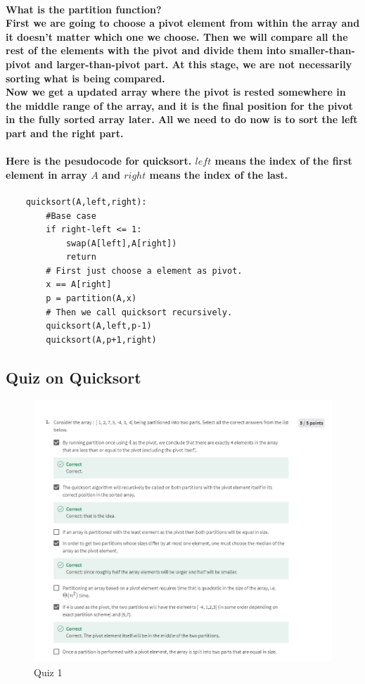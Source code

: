 \documentclass{article}
\begin{document}
 \paragraph{What is the partition function?\\
 First we are going to choose a pivot element from within the array and it doesn't matter which one we choose.
 Then we will compare all the rest of the elements with the pivot and divide them into smaller-than-pivot and 
 larger-than-pivot part. At this stage, we are not necessarily sorting what is being compared.\\
 Now we get a updated array where the pivot is rested somewhere in the middle range of the array, and it is the final position for 
 the pivot in the fully sorted array later. All we need to do now is to sort the left part and the right part.\\}

\paragraph{Here is the pesudocode for quicksort. $left$ means the index of the first element in array $A$ and $right$ means the index of the last.\\}

\begin{verbatim}
    quicksort(A,left,right):
        #Base case
        if right-left <= 1:
            swap(A[left],A[right])
            return
        # First just choose a element as pivot.
        x == A[right]
        p = partition(A,x)
        # Then we call quicksort recursively.
        quicksort(A,left,p-1)
        quicksort(A,p+1,right)
\end{verbatim}

\subsection{Quiz on Quicksort}

\begin{figure}[H]
    \includegraphics[width=\textwidth]{week3quicksortquiz1.png}
    \caption{Quiz 1\\}
\end{figure}
\end{document}
